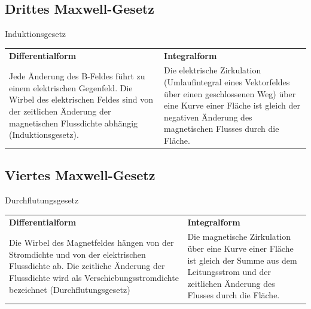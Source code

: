 \subsection{Drittes Maxwell-Gesetz}
Induktionsgesetz\\
\begin{tabular}{p{} p{}}
	\textbf{Differentialform}&\textbf{Integralform}\\
	Jede Änderung des B-Feldes führt zu einem elektrischen Gegenfeld. Die Wirbel des elektrischen Feldes sind von der zeitlichen Änderung der magnetischen Flussdichte abhängig (Induktionsgesetz). & Die elektrische Zirkulation (Umlaufintegral eines Vektorfeldes über  einen geschlossenen Weg) über eine Kurve einer Fläche ist gleich der negativen Änderung des magnetischen Flusses durch die Fläche.\\
\end{tabular}
\subsection{Viertes Maxwell-Gesetz}
Durchflutungsgesetz\\
\begin{tabular}{p{} p{}}
	\textbf{Differentialform}&\textbf{Integralform}\\
	Die Wirbel des Magnetfeldes hängen von der Stromdichte und von der elektrischen Flussdichte ab. Die zeitliche Änderung der Flussdichte wird als Verschiebungsstromdichte bezeichnet (Durchflutungsgesetz)& Die magnetische Zirkulation über eine Kurve einer Fläche ist gleich der Summe aus dem Leitungsstrom und der zeitlichen Änderung des Flusses durch die Fläche. \\
\end{tabular}
\clearpage
\pagebreak

